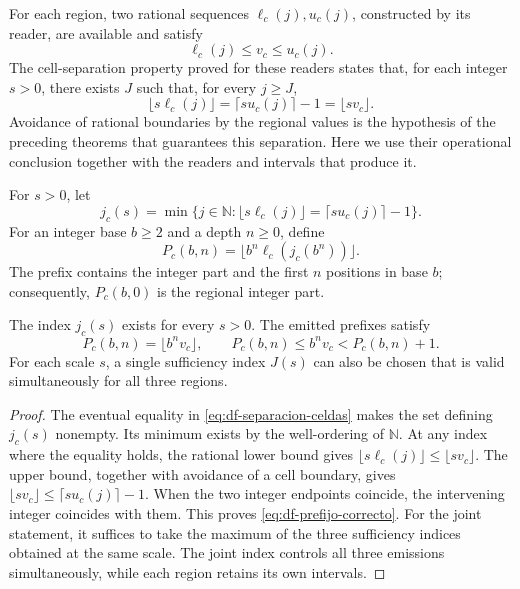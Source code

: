 For each region, two rational sequences
\(\ell_c(j),u_c(j)\), constructed by its reader, are available and satisfy
\[
 \ell_c(j)\leq v_c\leq u_c(j).
\]
The cell-separation property proved for these readers states that, for
each integer \(s>0\), there exists \(J\) such that, for every \(j\geq J\),
\begin{equation}
 \lfloor s\ell_c(j)\rfloor
 =\lceil su_c(j)\rceil-1
 =\lfloor sv_c\rfloor.
 \label{eq:df-separacion-celdas}
\end{equation}
Avoidance of rational boundaries by the regional values is the hypothesis
of the preceding theorems that guarantees this separation. Here we use
their operational conclusion together with the readers and intervals
that produce it.

\begin{definition}
For \(s>0\), let
\[
 j_c(s)=\min\{j\in\mathbb N:
 \lfloor s\ell_c(j)\rfloor=\lceil su_c(j)\rceil-1\}.
\]
For an integer base \(b\geq2\) and a depth \(n\geq0\), define
\begin{equation}
 P_c(b,n)=\lfloor b^n\ell_c(j_c(b^n))\rfloor.
 \label{eq:df-publicacion-prefijo}
\end{equation}
The prefix contains the integer part and the first \(n\) positions in base
\(b\); consequently, \(P_c(b,0)\) is the regional integer part.
\end{definition}

\begin{theorem}
\label{thm:df-emision-correcta}
The index \(j_c(s)\) exists for every \(s>0\). The emitted prefixes satisfy
\begin{equation}
 P_c(b,n)=\lfloor b^n v_c\rfloor,
 \qquad
 P_c(b,n)\leq b^n v_c<P_c(b,n)+1.
 \label{eq:df-prefijo-correcto}
\end{equation}
For each scale \(s\), a single sufficiency index \(J(s)\) can also be
chosen that is valid simultaneously for all three regions.
\end{theorem}

\begin{proof}
The eventual equality in \eqref{eq:df-separacion-celdas} makes the set
defining \(j_c(s)\) nonempty. Its minimum exists by the well-ordering of
\(\mathbb N\). At any index where the equality holds, the rational lower
bound gives
\(\lfloor s\ell_c(j)\rfloor\leq\lfloor sv_c\rfloor\).
The upper bound, together with avoidance of a cell boundary, gives
\(\lfloor sv_c\rfloor\leq\lceil su_c(j)\rceil-1\).
When the two integer endpoints coincide, the intervening integer coincides
with them. This proves \eqref{eq:df-prefijo-correcto}. For the joint
statement, it suffices to take the maximum of the three sufficiency indices
obtained at the same scale. The joint index controls all three emissions
simultaneously, while each region retains its own intervals.
\end{proof}

